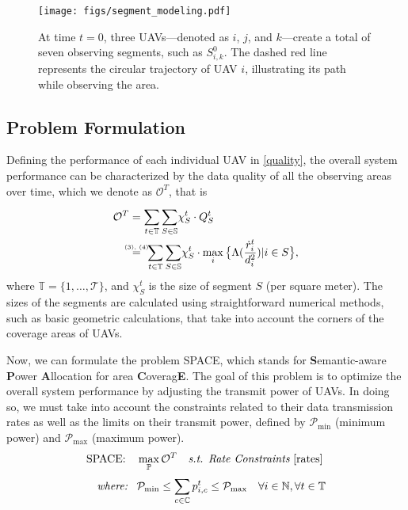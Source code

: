 \documentclass[conference]{IEEEtran}
\newcommand\myeq{\mathrel{\stackrel{\makebox[0pt]{\mbox{\normalfont\tiny (3), (4)}}}{=}}}
\begin{document}
\begin{figure}[!t]
    \centerline{\texttt{[image: figs/segment\_modeling.pdf]}}
    \caption{At time \(t = 0\), three UAVs—denoted as \(i\), \(j\), and \(k\)—create a total of seven observing segments, such as \(S_{{i, k}}^{0}\). The dashed red line represents the circular trajectory of UAV \(i\), illustrating its path while observing the area.}
    \vspace{-10pt}
    \label{segment_modeling}
\end{figure}

\subsection{Problem Formulation}\label{ss_prb_frm}
Defining the performance of each individual UAV in \eqref{quality}, the overall system performance can be characterized by the data quality of all the observing areas over time, which we denote as \(\mathcal{O}^{T}\), that is
\begin{align}\label{eq_obj}
\mathcal{O}^{T} &= \sum_{t \in \mathbb{T} }^{}{\sum_{S \in \mathbb{S} }^{}}{\chi_{S}^{t} \cdot {Q}_{S}^{t}} \notag \\
&\myeq \ \sum_{t \in \mathbb{T} }^{}{\sum_{S \in \mathbb{S} }^{}}{\chi_{S}^{t} \cdot \max_{i} \big\{ \Lambda( \frac{\dot{r}_{i}^{t}}{{d}_{i}^{2}} ) | i \in S \big\} },
\end{align}
where $\mathbb{T} = \{1, \ldots, \mathcal{T} \}$, and $\chi_{S}^{t}$ is the size of segment $S$ (per square meter). The sizes of the segments are calculated using straightforward numerical methods, such as basic geometric calculations, that take into account the corners of the coverage areas of UAVs.

Now, we can formulate the problem SPACE, which stands for \textbf{S}emantic-aware \textbf{P}ower \textbf{A}llocation for area \textbf{C}overag\textbf{E}. The goal of this problem is to optimize the overall system performance by adjusting the transmit power of UAVs. In doing so, we must take into account the constraints related to their data transmission rates as well as the limits on their transmit power, defined by \(\mathcal{P}_{\text{min}}\) (minimum power) and \(\mathcal{P}_{\text{max}}\) (maximum power).
\begin{align}\label{eq_prb}
    \text{SPACE:} \quad & \max_{\mathbb{P}}{\mathcal{O}^{T}} \quad \textit{s.t. Rate Constraints} \ \eqref{rates} \notag \\
     \textit{where: \ } &\mathcal{P}_{\text{min}} \leq \sum_{c \in \mathbb{C}}^{}{p_{i, c}^{t}} \leq \mathcal{P}_{\text{max}} \quad \forall i \in \mathbb{N}, \forall t \in \mathbb{T} \notag
\end{align}
\end{document}
